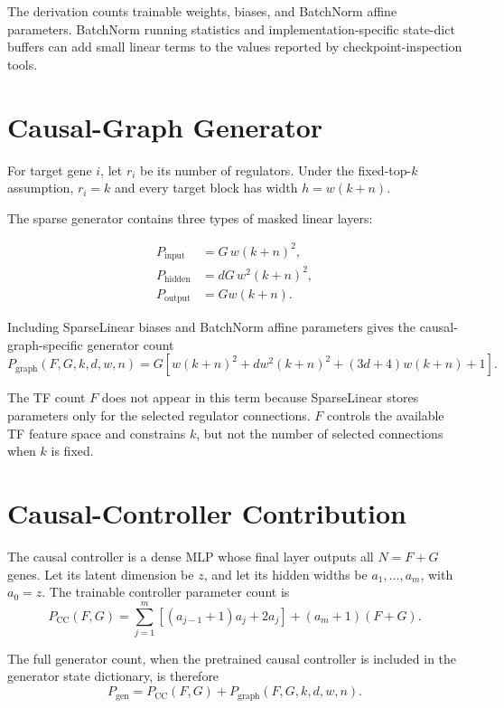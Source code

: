 \documentclass[11pt]{article}
\begin{document}
The derivation counts trainable weights, biases, and BatchNorm affine parameters. BatchNorm
running statistics and implementation-specific state-dict buffers can add small linear terms to
the values reported by checkpoint-inspection tools.

\section{Causal-Graph Generator}

For target gene $i$, let $r_i$ be its number of regulators. Under the fixed-top-$k$ assumption,
$r_i=k$ and every target block has width $h=w(k+n)$.

The sparse generator contains three types of masked linear layers:

\begin{align}
P_{\mathrm{input}} &= G\,w(k+n)^2,\\
P_{\mathrm{hidden}} &= dG\,w^2(k+n)^2,\\
P_{\mathrm{output}} &= Gw(k+n).
\end{align}

Including SparseLinear biases and BatchNorm affine parameters gives the causal-graph-specific
generator count
\begin{equation}
\boxed{
P_{\mathrm{graph}}(F,G,k,d,w,n)
=G\left[
w(k+n)^2
{}+d w^2(k+n)^2
{}+(3d+4)w(k+n)
{}+1
\right].
}
\end{equation}

The TF count $F$ does not appear in this term because SparseLinear stores parameters only for
the selected regulator connections. $F$ controls the available TF feature space and constrains
$k$, but not the number of selected connections when $k$ is fixed.

\section{Causal-Controller Contribution}

The causal controller is a dense MLP whose final layer outputs all $N=F+G$ genes. Let its latent
dimension be $z$, and let its hidden widths be $a_1,\ldots,a_m$, with $a_0=z$. The trainable
controller parameter count is
\begin{equation}
P_{\mathrm{CC}}(F,G)
=\sum_{j=1}^{m}\left[(a_{j-1}+1)a_j+2a_j\right]
+(a_m+1)(F+G).
\end{equation}

The full generator count, when the pretrained causal controller is included in the generator
state dictionary, is therefore
\begin{equation}
\boxed{
P_{\mathrm{gen}}
=P_{\mathrm{CC}}(F,G)+P_{\mathrm{graph}}(F,G,k,d,w,n).
}
\end{equation}
\end{document}
